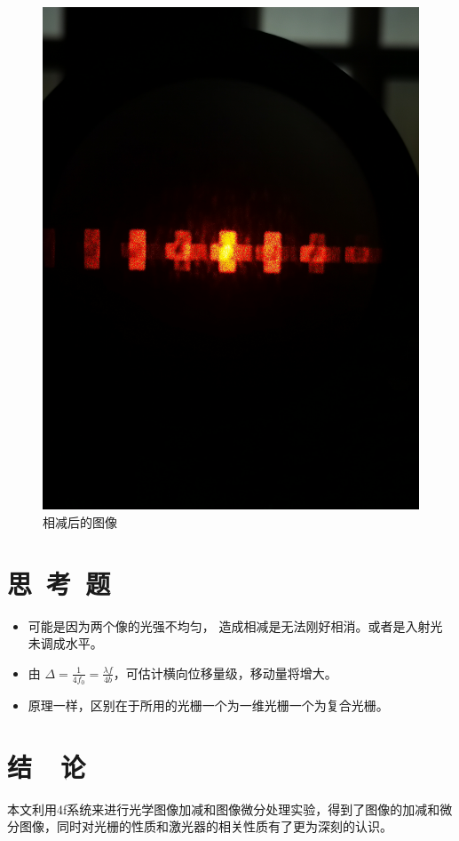 \documentclass{buaaemp}
\begin{document}
\begin{figure}
    \centering
    \includegraphics[width=\linewidth]{image/微信图片_202211092329211.jpg}
    \caption{相减后的图像}
    \label{fig:my_label3}
\end{figure}


\section{思~考~题}
\begin{itemize}
    \item 可能是因为两个像的光强不均匀， 造成相减是无法刚好相消。或者是入射光未调成水平。
    \item 由 $\Delta=\frac{1}{4f_0}=\frac{\lambda f}{4b}$，可估计横向位移量级，移动量将增大。
    \item 原理一样，区别在于所用的光栅一个为一维光栅一个为复合光栅。
\end{itemize}

\section{结~~论}
本文利用4f系统来进行光学图像加减和图像微分处理实验，得到了图像的加减和微分图像，同时对光栅的性质和激光器的相关性质有了更为深刻的认识。
\end{document}
